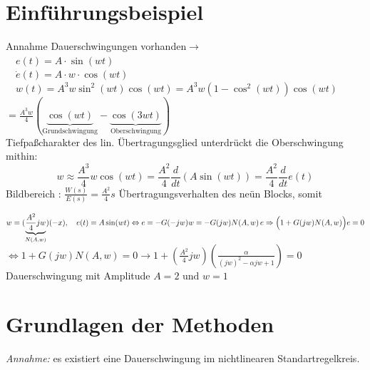 \documentclass[ngerman]{tudscrreprt}
\begin{document}
\section{Einführungsbeispiel}
\begin{figure}[H] 
  \centering 
  \def\svgwidth{200pt} 
   
\end{figure} 
Annahme Dauerschwingungen vorhanden$\rightarrow $ 
\\$\quad e(t) = A \cdot \sin{(wt)}$
\\$\quad \dot{e}(t)=A\cdot w \cdot \cos(wt) $
\\$\quad w(t) = A^3 w \sin^2 (wt)\cos(wt)= A^3 w (1-\cos^2(wt))\cos(wt)$
									$     = \frac{A^3 w}{4} (\underbrace{\cos(wt)}_{\text{Grundschwingung}} -\underbrace{\cos(3 w t)}_{\text{Oberschwingung}})$
\\ Tiefpaßcharakter des lin. Übertragungsglied unterdrückt die Oberschwingung \\
mithin: \begin{equation*}w\approx \frac{A^3}{4} w\cos(wt) = \frac{A^2}{4} \frac{d}{dt} (A \sin(wt)) = \frac{A^2}{4} \frac{d}{dt}e(t)\end{equation*}
Bildbereich : $\frac{W(s)}{E(s)} = \frac{A^2}{4} s $ Übertragungsverhalten des neün Blocks, somit 
\begin{figure}[H] 
  \centering 
  \def\svgwidth{180pt} 
   
\end{figure} 
$w = (\underbrace{\frac{A^2}{4} jw}_{N(A,w)})(-x),\quad e(t) = A \sin(wt) \\ \Leftrightarrow e = - G(-jw)w  = -G(jw)N(A,w)\,e \Rightarrow \Big(1+G(jw) N(A,w) \Big) e = 0$ \\ $ \Leftrightarrow 1+ G(jw) N(A,w) = 0 \rightarrow 1+ (\frac{A^2}{4} jw) (\frac{\alpha}{(jw)^2 - \alpha jw +1 }) = 0$ \\ Dauerschwingung mit Amplitude $A=2 \text{ und } w=1$ 
\section{Grundlagen der Methoden}
\textit{Annahme:} es existiert eine Dauerschwingung im nichtlinearen Standartregelkreis. \\
\end{document}
